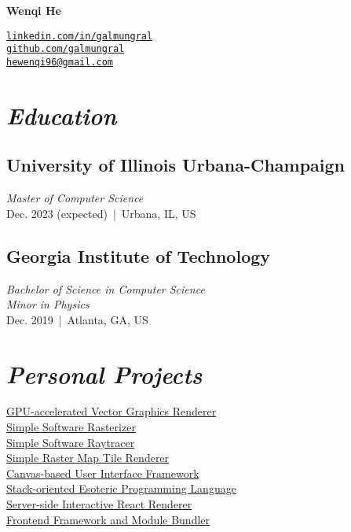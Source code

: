 \documentclass[11pt]{article}
\begin{document}
 
\centering

\begin{minipage}{250pt}
{\Huge\bf Wenqi He}

\vspace{10pt}
\texttt{\href{https://linkedin.com/in/galmungral}{linkedin.com/in/galmungral}\\
\href{https://github.com/galmungral}{github.com/galmungral}\\
\href{mailto:hewenqi96@gmail.com}{hewenqi96@gmail.com}
}


\section*{\it Education}

\subsection*{University of Illinois Urbana-Champaign}
\textit{Master of Computer Science}\\
Dec. 2023 (expected) \,|\, Urbana, IL, US

\subsection*{Georgia Institute of Technology}
\textit{Bachelor of Science in Computer Science}\\
\textit{Minor in Physics}\\
Dec. 2019 \,|\, Atlanta, GA, US

\section*{\it Personal Projects}

\href{https://github.com/galmungral/polyrender}{GPU-accelerated Vector Graphics Renderer}\\
\href{https://github.com/galmungral/rasterizer}{Simple Software Rasterizer}\\
\href{https://github.com/galmungral/simple-raytracer}{Simple Software Raytracer}\\
\href{https://github.com/galmungral/mercator}{Simple Raster Map Tile Renderer}\\
\href{https://github.com/galmungral/michelangelo}{Canvas-based User Interface Framework}\\
\href{https://github.com/galmungral/hanbun-lang}{Stack-oriented Esoteric Programming Language} \\
\href{https://github.com/galmungral/react-teletype}{Server-side Interactive React Renderer} \\
\href{https://github.com/galmungral/replay}{Frontend Framework and Module Bundler}



\end{minipage}
\end{document}
